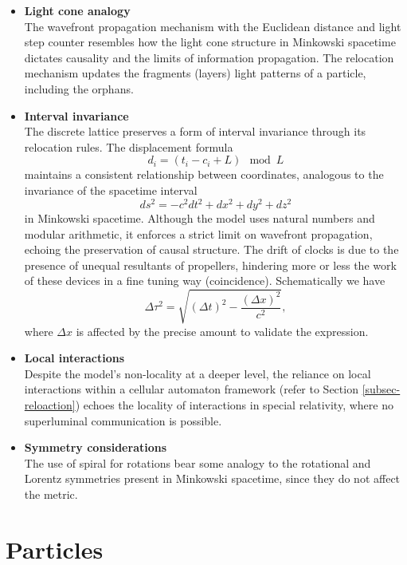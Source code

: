 \documentclass[12pt,english]{article}
\begin{document}
\begin{itemize}
    \item \textbf{Light cone analogy} \\ 
    The wavefront propagation mechanism with the Euclidean distance and light step counter resembles how the light cone structure in Minkowski spacetime dictates causality and the limits of information propagation.
    The relocation mechanism updates the fragments (layers) light patterns of a particle, including the orphans.

    \item \textbf{Interval invariance} \\
    The discrete lattice preserves a form of interval invariance through its relocation rules. The displacement formula 
    \[
    d_i = (t_i - c_i + L) \mod L
    \]
    maintains a consistent relationship between coordinates, analogous to the invariance of the spacetime interval 
    \[
    ds^2 = -c^2 dt^2 + dx^2 + dy^2 + dz^2
    \]
    in Minkowski spacetime. Although the model uses natural numbers and modular arithmetic, it enforces a strict limit on wavefront propagation, echoing the preservation of causal structure. The drift of clocks is due to the presence of unequal resultants of propellers, hindering more or less the work of these devices in a fine tuning way (coincidence). Schematically we have
    \[
    \Delta \tau^2=\sqrt{(\Delta t)^2-\frac{(\Delta x)^2}{c^2}},
    \]
    where $\Delta x$ is affected by the precise amount to validate the expression.

    \item \textbf{Local interactions} \\ 
    Despite the model's non-locality at a deeper level, the reliance on local interactions within a cellular automaton framework (refer to Section \ref{subsec-reloaction}) echoes the locality of interactions in special relativity, where no superluminal communication is possible.

    \item \textbf{Symmetry considerations} \\ 
    The use of spiral for rotations bear some analogy to the rotational and Lorentz symmetries present in Minkowski spacetime, since they do not affect the metric.

\end{itemize}


\section{Particles\label{sec:Particles}}
\end{document}
